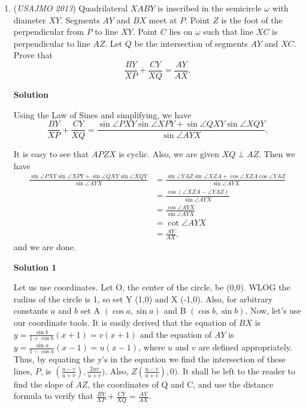 \begin{enumerate}
 Thus, the answer is $2^{11}-1=\boxed{2047}$.

 This was pretty intuitive, and realizing quite $elementary$ steps about how powers of 2 work gave us the solution! Estimated time: ~50 minutes. 

 minor edits ~mathboy100

 


	\item (\textit{USAJMO 2013}) Quadrilateral $XABY$ is inscribed in the semicircle $\omega$ with diameter $XY$.  Segments $AY$ and $BX$ meet at $P$.  Point $Z$ is the foot of the perpendicular from $P$ to line $XY$.  Point $C$ lies on $\omega$ such that line $XC$ is perpendicular to line $AZ$.  Let $Q$ be the intersection of segments $AY$ and $XC$.  Prove that 
 \[\dfrac{BY}{XP}+\dfrac{CY}{XQ}=\dfrac{AY}{AX}.\]




\textbf{Solution}

Using the Law of Sines and simplifying, we have 
 \[\frac{BY}{XP}+\frac{CY}{XQ}=\frac{\sin \angle PXY \sin \angle XPY+\sin \angle QXY\sin \angle XQY}{\sin \angle AYX}.\]

 It is easy to see that $APZX$ is cyclic. Also, we are given $XQ\perp AZ$. Then we have 
 \begin{align*} \frac{\sin \angle PXY\sin \angle XPY+\sin \angle QXY\sin \angle XQY}{\sin \angle AYX} &= \frac{\sin \angle YAZ\sin \angle XZA+\cos \angle XZA\cos \angle YAZ}{\sin \angle AYX} \\ &= \frac{\cos(\angle XZA-\angle YAZ)}{\sin \angle AYX} \\ &= \frac{\cos \angle AYX}{\sin \angle AYX} \\ &= \cot \angle AYX \\ &= \frac{AY}{AX}, \end{align*}
 and we are done.

 



\textbf{Solution 1}

Let us use coordinates. Let O, the center of the circle, be (0,0). WLOG the radius of the circle is 1, so set Y (1,0) and X (-1,0). Also, for arbitrary constants $a$ and $b$ set A $(\cos a, \sin a)$ and B $(\cos b, \sin b)$. Now, let's use our coordinate tools. It is easily derived that the equation of $BX$ is $y = \frac{\sin b}{1 + \cos b}(x + 1) = v(x+1)$ and the equation of $AY$ is $y = \frac{\sin a}{1 - \cos a}(x - 1) = u(x-1)$, where $u$ and $v$ are defined appropriately. Thus, by equating the y's in the equation we find the intersection of these lines, $P$, is $\left(\frac{u-v}{u+v}\right), \frac{2uv}{u+v})$. Also, $Z\left(\frac{u-v}{u+v}\right), 0)$. It shall be left to the reader to find the slope of $AZ$, the coordinates of Q and C, and use the distance formula to verify that $\frac{BY}{XP} + \frac{CY}{XQ} = \frac{AY}{AX}$.


\end{enumerate}
